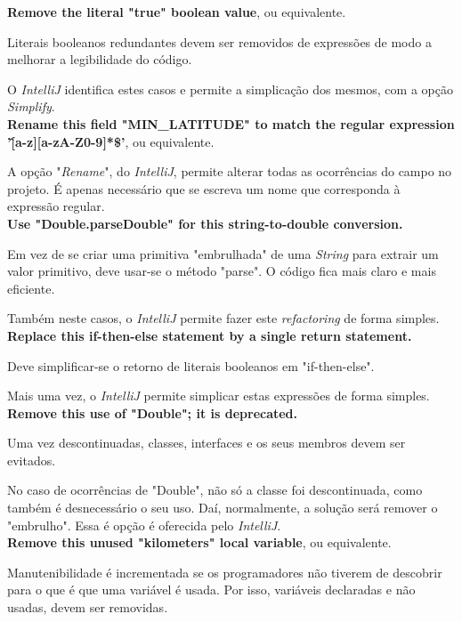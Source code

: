 \documentclass[a4paper]{report}
\begin{document}
\begin{itemize}
    \textbf{Remove the literal "true" boolean value}, ou equivalente.
    
    Literais booleanos redundantes devem ser removidos de expressões de modo a melhorar a legibilidade do código.
    
    O \textit{IntelliJ} identifica estes casos e permite a simplicação dos mesmos, com a opção \textit{Simplify}. \\


    \textbf{Rename this field "MIN\_LATITUDE" to match the regular expression '\^[a-z][a-zA-Z0-9]*\$'}, ou equivalente.

    A opção "\textit{Rename}", do \textit{IntelliJ}, permite alterar todas as ocorrências do campo no projeto. É apenas necessário que se escreva um nome que corresponda à expressão regular. \\


    \textbf{Use "Double.parseDouble" for this string-to-double conversion.}

    Em vez de se criar uma primitiva "embrulhada" de uma \textit{String} para extrair um valor primitivo, deve usar-se o método "parse". O código fica mais claro e mais eficiente.

    Também neste casos, o \textit{IntelliJ} permite fazer este \textit{refactoring} de forma simples. \\


    \textbf{Replace this if-then-else statement by a single return statement.}

    Deve simplificar-se o retorno de literais booleanos em "if-then-else".

    Mais uma vez, o \textit{IntelliJ} permite simplicar estas expressões de forma simples. \\


    \textbf{Remove this use of "Double"; it is deprecated.}

    Uma vez descontinuadas, classes, interfaces e os seus membros devem ser evitados.

    No caso de ocorrências de "Double", não só a classe foi descontinuada, como também é desnecessário o seu uso. Daí, normalmente, a solução será remover o "embrulho".
    Essa é opção é oferecida pelo \textit{IntelliJ}. \\

    
    \textbf{Remove this unused "kilometers" local variable}, ou equivalente.

    Manutenibilidade é incrementada se os programadores não tiverem de descobrir para o que é que uma variável é usada. Por isso, variáveis declaradas e não usadas, devem ser removidas.


\end{itemize}
\end{document}
